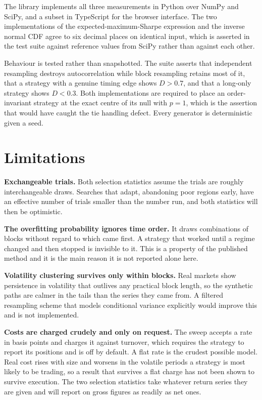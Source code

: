 \documentclass[11pt]{article}
\begin{document}
The library implements all three measurements in Python over NumPy and SciPy, and a subset in TypeScript for the browser interface. The two implementations of the expected-maximum-Sharpe expression and the inverse normal CDF agree to six decimal places on identical input, which is asserted in the test suite against reference values from SciPy rather than against each other.

Behaviour is tested rather than snapshotted. The suite asserts that independent resampling destroys autocorrelation while block resampling retains most of it, that a strategy with a genuine timing edge shows $D > 0.7$, and that a long-only strategy shows $D < 0.3$. Both implementations are required to place an order-invariant strategy at the exact centre of its null with $p = 1$, which is the assertion that would have caught the tie handling defect. Every generator is deterministic given a seed.

\section{Limitations}\label{sec:limitations}

\textbf{Exchangeable trials.} Both selection statistics assume the trials are roughly interchangeable draws. Searches that adapt, abandoning poor regions early, have an effective number of trials smaller than the number run, and both statistics will then be optimistic.

\textbf{The overfitting probability ignores time order.} It draws combinations of blocks without regard to which came first. A strategy that worked until a regime changed and then stopped is invisible to it. This is a property of the published method and it is the main reason it is not reported alone here.

\textbf{Volatility clustering survives only within blocks.} Real markets show persistence in volatility that outlives any practical block length, so the synthetic paths are calmer in the tails than the series they came from. A filtered resampling scheme that models conditional variance explicitly would improve this and is not implemented.

\textbf{Costs are charged crudely and only on request.} The sweep accepts a rate in basis points and charges it against turnover, which requires the strategy to report its positions and is off by default. A flat rate is the crudest possible model. Real cost rises with size and worsens in the volatile periods a strategy is most likely to be trading, so a result that survives a flat charge has not been shown to survive execution. The two selection statistics take whatever return series they are given and will report on gross figures as readily as net ones.
\end{document}
